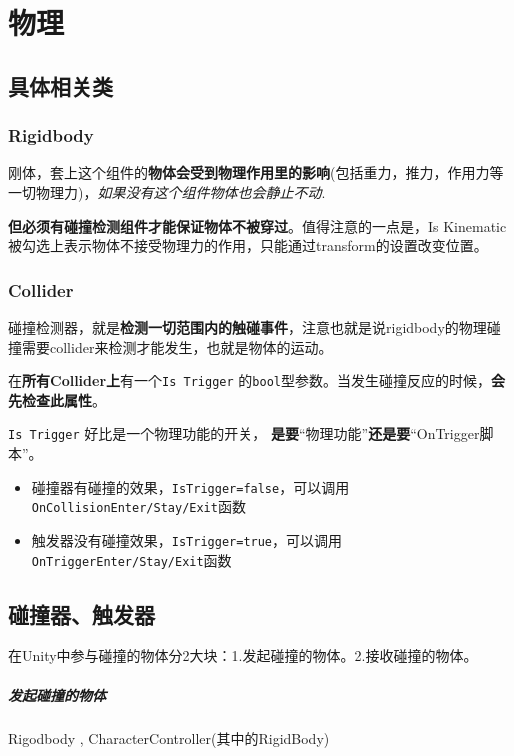 \documentclass[UTF8,a4paper,12pt]{ctexbook}
\begin{document}
		
		
\chapter{物理}
	\section{具体相关类}
		\subsection{Rigidbody}
			刚体，套上这个组件的\textbf{物体会受到物理作用里的影响}(包括重力，推力，作用力等一切物理力)，\textit{如果没有这个组件物体也会静止不动}.
			
			\textbf{但必须有碰撞检测组件才能保证物体不被穿过}。值得注意的一点是，Is Kinematic被勾选上表示物体不接受物理力的作用，只能通过transform的设置改变位置。
		
		\subsection{Collider}
			碰撞检测器，就是\textbf{检测一切范围内的触碰事件}，注意也就是说rigidbody的物理碰撞需要collider来检测才能发生，也就是物体的运动。
		
			在\textbf{所有Collider上}有一个\verb|Is Trigger| 的\verb|bool|型参数。当发生碰撞反应的时候，\textbf{会先检查此属性}。
				
			\verb|Is Trigger| 好比是一个物理功能的开关， \textbf{是要}“物理功能”\textbf{还是要}“OnTrigger脚本”。
			\begin{itemize}
				\item 碰撞器有碰撞的效果，\verb|IsTrigger=false|，可以调用\verb|OnCollisionEnter/Stay/Exit|函数
				\item 触发器没有碰撞效果，\verb|IsTrigger=true|，可以调用\verb|OnTriggerEnter/Stay/Exit|函数
			\end{itemize}
	
	\section{碰撞器、触发器}
		在Unity中参与碰撞的物体分2大块：1.发起碰撞的物体。2.接收碰撞的物体。
		
		\paragraph{发起碰撞的物体}
			Rigodbody , CharacterController(其中的RigidBody) 
		
\end{document}
